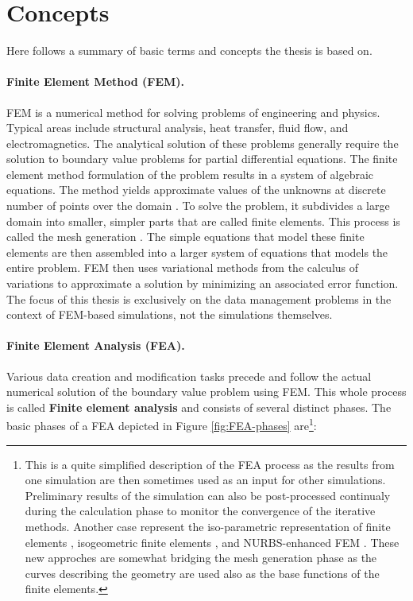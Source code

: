 
\section{Concepts}

Here follows a summary of basic terms and concepts the thesis is based on.

\paragraph{Finite Element Method (FEM).} FEM is a numerical method for solving problems of engineering and physics. Typical areas include structural analysis, heat transfer, fluid flow, and electromagnetics. The analytical solution of these problems generally require the solution to boundary value problems for partial differential equations. The finite element method formulation of the problem results in a system of algebraic equations. The method yields approximate values of the unknowns at discrete number of points over the domain \cite{Fish2007}. To solve the problem, it subdivides a large domain into smaller, simpler parts that are called finite elements. This process is called the mesh generation \cite{Frey2000,Rypl1998}. The simple equations that model these finite elements are then assembled into a larger system of equations that models the entire problem. FEM then uses variational methods from the calculus of variations to approximate a solution by minimizing an associated error function. The focus of this thesis is exclusively on the data management problems in the context of FEM-based simulations, not the simulations themselves.


\paragraph{Finite Element Analysis (FEA).} Various data creation and modification tasks precede and follow the actual numerical solution of the boundary value problem using FEM. This whole process is called \textbf{Finite element analysis} and consists of several distinct phases. The basic phases of a FEA depicted in Figure \ref{fig:FEA-phases} are\footnote{This is a quite simplified description of the FEA process as the results from one simulation are then sometimes used as an input for other simulations. Preliminary results of the simulation can also be post-processed continualy during the calculation phase to monitor the convergence of the iterative methods. Another case represent the iso-parametric representation of finite elements \cite{Bergheau2008}, isogeometric finite elements \cite{Hughes2005}, and NURBS-enhanced FEM \cite{Legrain2013}. These new approches are somewhat bridging the mesh generation phase as the curves describing the geometry are used also as the base functions of the finite elements.}:


